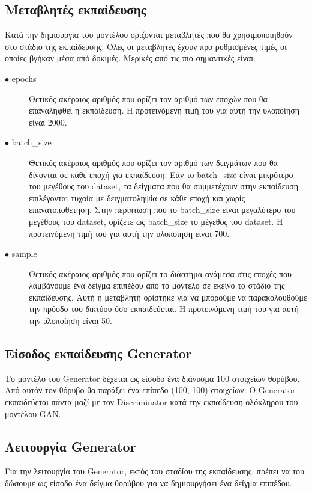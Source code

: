 \subsection{Μεταβλητές εκπαίδευσης}
Κατά την δημιουργία του μοντέλου ορίζονται μεταβλητές που θα χρησιμοποιηθούν στο στάδιο της εκπαίδευσης. Όλες οι μεταβλητές έχουν προ ρυθμισμένες τιμές οι οποίες βγήκαν μέσα από δοκιμές. Μερικές από τις πιο σημαντικές είναι:


\begin{description}
\item[$\bullet$ epochs] Θετικός ακέραιος αριθμός που ορίζει τον αριθμό των εποχών που θα επαναληφθεί η εκπαίδευση. Η προτεινόμενη τιμή του για αυτή την υλοποίηση είναι 2000.
\item[$\bullet$ batch\_size] Θετικός ακέραιος αριθμός που ορίζει τον αριθμό των δειγμάτων που θα δίνονται σε κάθε εποχή για εκπαίδευση. Εάν το batch\_size είναι μικρότερο του μεγέθους του dataset, τα δείγματα που θα συμμετέχουν στην εκπαίδευση επιλέγονται τυχαία με δειγματοληψία σε κάθε εποχή και χωρίς επανατοποθέτηση. Στην περίπτωση που το batch\_size είναι μεγαλύτερο του μεγέθους του dataset, ορίζετε ως batch\_size το μέγεθος του dataset. Η προτεινόμενη τιμή του για αυτή την υλοποίηση είναι 700.
\item[$\bullet$ sample] Θετικός ακέραιος αριθμός που ορίζει το διάστημα ανάμεσα στις εποχές που λαμβάνουμε ένα δείγμα επιπέδου από το μοντέλο σε εκείνο το στάδιο της εκπαίδευσης. Αυτή η μεταβλητή ορίστηκε για να μπορούμε να παρακολουθούμε την πρόοδο του δικτύου όσο εκπαιδεύεται. Η προτεινόμενη τιμή του για αυτή την υλοποίηση είναι 50.
\end{description}

\subsection{Είσοδος εκπαίδευσης Generator}
Το μοντέλο του Generator δέχεται ως είσοδο ένα διάνυσμα 100 στοιχείων θορύβου. Από αυτόν τον θόρυβο θα παράξει ένα επίπεδο (100, 100) στοιχείων. O Generator εκπαιδεύεται πάντα μαζί με τον Discriminator κατά την εκπαίδευση ολόκληρου του μοντέλου GAN.

\subsection{Λειτουργία Generator}
Για την λειτουργία του Generator, εκτός του σταδίου της εκπαίδευσης, πρέπει να του δώσουμε ως είσοδο ένα δείγμα θορύβου για να δημιουργήσει ένα δείγμα επιπέδου.


